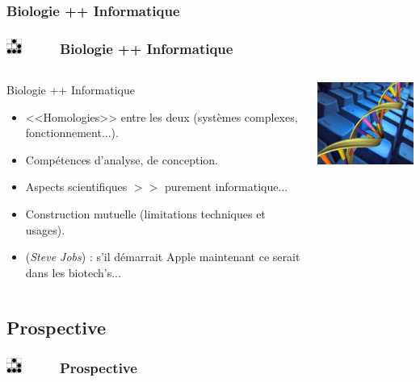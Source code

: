 \documentclass[slidetop,11pt]{beamer}
\def\sectionPartIIIbTR{Biologie ++ Informatique}
\def\sectionPartIIIc{Prospective}
\def\moreInFrameTitle{\includegraphics[height=0.5cm]{img/logo_glider.png}~~~~~}
\begin{document}
\subsubsection{\sectionPartIIIbTR}
\begin{frame}
	\frametitle{\moreInFrameTitle \sectionPartIIIbTR}
	\begin{columns}[c]
	\begin{column}[c]{7cm}
		 \begin{beamerboxesrounded}	[lower=substructureTR, %
		 				 upper=block title TR,%
						 shadow=true]%
		       {\sectionPartIIIbTR}
			\begin{itemize}
				\item<1-> <<Homologies>> entre les deux (syst{\`e}mes complexes, fonctionnement...). 
				\item<2-> Comp{\'e}tences d'analyse, de conception. 
				\item<2-> Aspects scientifiques $ >> $ purement informatique... 
				\item<3-> Construction mutuelle (limitations techniques et usages). 
				\item<4-> (\emph{Steve Jobs}) : s'il d{\'e}marrait Apple maintenant ce serait dans les biotech's... 
			\end{itemize}
		\end{beamerboxesrounded}
	\end{column}
	\begin{column}[c]{4cm}
		\includegraphics[width=4cm]{img/bioinformatique.png}~\\
	\end{column}
	\end{columns}
\end{frame} 

\subsection{\sectionPartIIIc}
\begin{frame}
	\frametitle{\moreInFrameTitle \sectionPartIIIc}
	\tableofcontents[sections=3,subsectionstyle=show/shaded/hide]
\end{frame} 
\end{document}

